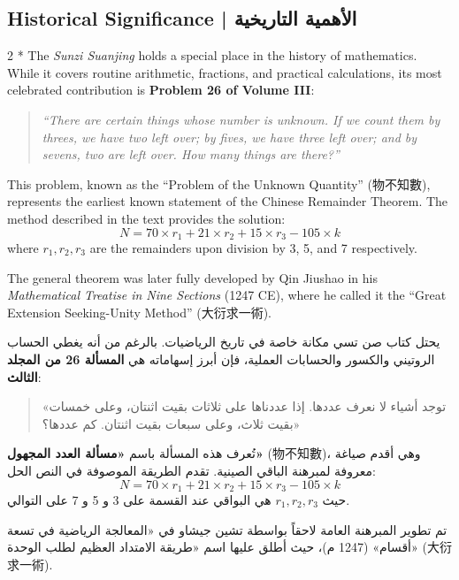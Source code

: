 \documentclass[11pt,a4paper]{article}
\newcommand{\ar}[1]{\arabicfont\beginR #1\endR}
\newcommand{\zh}[1]{{\CJKfamily{}#1}}
\begin{document}
\subsection{Historical Significance | \ar{الأهمية التاريخية}}

\begin{paracol}{2}
\switchcolumn[0]*\noindent
The \textit{Sunzi Suanjing} holds a special place in the history of mathematics. While it covers routine arithmetic, fractions, and practical calculations, its most celebrated contribution is \textbf{Problem 26 of Volume III}:

\begin{quote}
\textit{``There are certain things whose number is unknown. If we count them by threes, we have two left over; by fives, we have three left over; and by sevens, two are left over. How many things are there?''}
\end{quote}

This problem, known as the ``Problem of the Unknown Quantity'' (\zh{物不知數}), represents the earliest known statement of the Chinese Remainder Theorem. The method described in the text provides the solution:
\[N = 70 \times r_1 + 21 \times r_2 + 15 \times r_3 - 105 \times k\]
where $r_1, r_2, r_3$ are the remainders upon division by 3, 5, and 7 respectively.

The general theorem was later fully developed by Qin Jiushao in his \textit{Mathematical Treatise in Nine Sections} (1247 CE), where he called it the ``Great Extension Seeking-Unity Method'' (\zh{大衍求一術}).

\switchcolumn
\noindent
\ar{يحتل كتاب صن تسي مكانة خاصة في تاريخ الرياضيات. بالرغم من أنه يغطي الحساب الروتيني والكسور والحسابات العملية، فإن أبرز إسهاماته هي \textbf{المسألة 26 من المجلد الثالث}:}

\begin{quote}
\ar{«توجد أشياء لا نعرف عددها. إذا عددناها على ثلاثات بقيت اثنتان، وعلى خمسات بقيت ثلاث، وعلى سبعات بقيت اثنتان. كم عددها؟»}
\end{quote}

\ar{تُعرف هذه المسألة باسم \textbf{«مسألة العدد المجهول»} (物不知數)، وهي أقدم صياغة معروفة لمبرهنة الباقي الصينية. تقدم الطريقة الموصوفة في النص الحل:}
\[N = 70 \times r_1 + 21 \times r_2 + 15 \times r_3 - 105 \times k\]
\ar{حيث $r_1, r_2, r_3$ هي البواقي عند القسمة على 3 و 5 و 7 على التوالي.}

\ar{تم تطوير المبرهنة العامة لاحقاً بواسطة تشين جيشاو في «المعالجة الرياضية في تسعة أقسام» (1247 م)، حيث أطلق عليها اسم «طريقة الامتداد العظيم لطلب الوحدة» (大衍求一術).}
\end{paracol}
\end{document}
